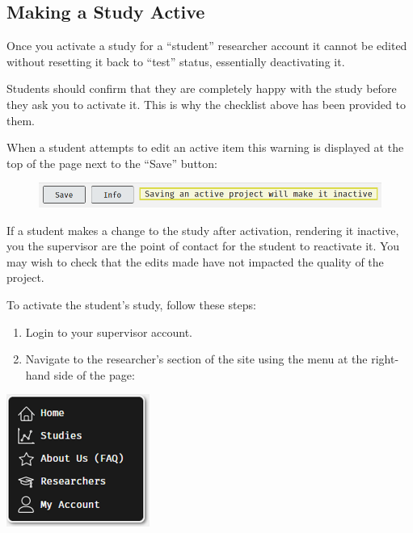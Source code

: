 \documentclass[]{book}
\providecommand{\tightlist}{%
  \setlength{\itemsep}{0pt}\setlength{\parskip}{0pt}}
\begin{document}
\subsection{Making a Study Active}\label{making-a-study-active}

\begin{warning}
Once you activate a study for a ``student'' researcher account it cannot
be edited without resetting it back to ``test'' status, essentially
deactivating it.

Students should confirm that they are completely happy with the study
before they ask you to activate it. This is why the checklist above has
been provided to them.

When a student attempts to edit an active item this warning is displayed
at the top of the page next to the ``Save'' button:

\begin{figure}
\centering
\includegraphics{images/screenshots/editwarning.png}
\caption{}
\end{figure}

If a student makes a change to the study after activation, rendering it
inactive, you the supervisor are the point of contact for the student to
reactivate it. You may wish to check that the edits made have not
impacted the quality of the project.
\end{warning}

To activate the student's study, follow these steps:

\begin{enumerate}
\def\labelenumi{\arabic{enumi}.}
\tightlist
\item
  Login to your supervisor account.
\item
  Navigate to the researcher's section of the site using the menu at the
  right-hand side of the page:
\end{enumerate}

\includegraphics{images/screenshots/active1.png}
\end{document}
